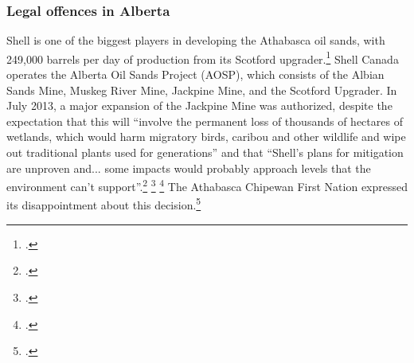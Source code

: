 	\subsubsection{Legal offences in Alberta}
	


Shell is one of the biggest players in developing the Athabasca oil sands, with 249,000 barrels per day of production from its Scotford upgrader.\footcite{AlbertaEnergy}
Shell Canada operates the Alberta Oil Sands Project (AOSP), which consists of the Albian Sands Mine, Muskeg River Mine, Jackpine Mine, and the Scotford Upgrader. 
In July 2013, a major expansion of the Jackpine Mine was authorized, despite the expectation that this will ``involve the permanent loss of thousands of hectares of wetlands, which would harm migratory birds, caribou and other wildlife and wipe out traditional plants used for generations'' and that ``Shell's plans for mitigation are unproven and... some impacts would probably approach levels that the environment can't support''.\footcite[][]{JointReviewPanelJackpine} \footcite[][]{AlbertaGreenlightsJackpine} \footcite[][]{JackpineConcerns}
The Athabasca Chipewan First Nation expressed its disappointment about this decision.\footcite[][]{ACFNDisappointed}



